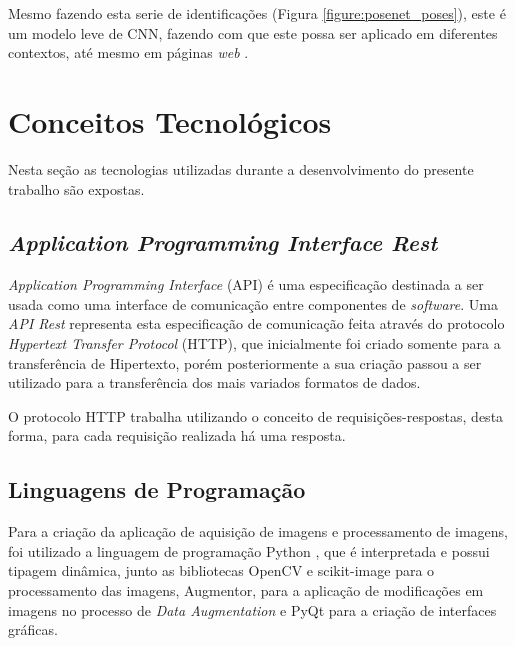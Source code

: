 
\par Mesmo fazendo esta serie de identificações (Figura \ref{figure:posenet_poses}), este é um modelo leve de CNN, fazendo com que este possa ser aplicado em diferentes contextos, até mesmo em páginas \textit{web} \cite{PoseNetMedium2019}.

\section{Conceitos Tecnológicos}

Nesta seção as tecnologias utilizadas durante a desenvolvimento do presente trabalho são expostas.

\subsection{\textit{Application Programming Interface Rest}}

\par \textit{Application Programming Interface} (API) é uma especificação destinada a ser usada como uma interface de comunicação entre componentes de \textit{software}. Uma \textit{API Rest} representa esta especificação de comunicação feita através do protocolo \textit{Hypertext Transfer Protocol} (HTTP), que inicialmente foi criado somente para a transferência de Hipertexto, porém posteriormente a sua criação passou a ser utilizado para a transferência dos mais variados formatos de dados.

\par O protocolo HTTP trabalha utilizando o conceito de requisições-respostas, desta forma, para cada requisição realizada há uma resposta.

\subsection{Linguagens de Programação}

\par Para a criação da aplicação de aquisição de imagens e processamento de imagens, foi utilizado a linguagem de programação Python \cite{Python2019}, que é interpretada e possui tipagem dinâmica, junto as bibliotecas OpenCV e scikit-image para o processamento das imagens, Augmentor, para a aplicação de modificações em imagens no processo de \textit{Data Augmentation} e PyQt para a criação de interfaces gráficas.

